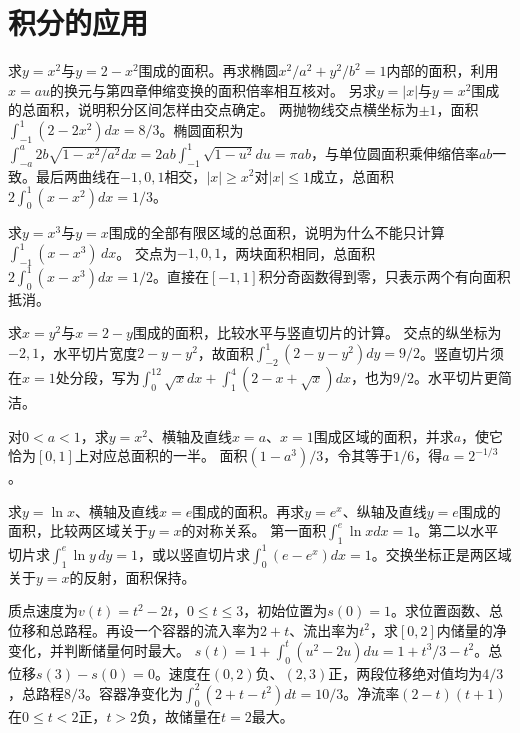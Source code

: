\par\addvspace{12pt}

\section{积分的应用}

求\(y=x^2\)与\(y=2-x^2\)围成的面积。再求椭圆\(x^2/a^2+y^2/b^2=1\)内部的面积，利用\(x=au\)的换元与第四章伸缩变换的面积倍率相互核对。
另求\(y=|x|\)与\(y=x^2\)围成的总面积，说明积分区间怎样由交点确定。
\solutionanswer
两抛物线交点横坐标为\(\pm1\)，面积\(\int_{-1}^1(2-2x^2)dx=8/3\)。椭圆面积为\(\int_{-a}^a2b\sqrt{1-x^2/a^2}dx=2ab\int_{-1}^1\sqrt{1-u^2}du=\pi ab\)，与单位圆面积乘伸缩倍率\(ab\)一致。最后两曲线在\(-1,0,1\)相交，\(|x|\ge x^2\)对\(|x|\le1\)成立，总面积\(2\int_0^1(x-x^2)dx=1/3\)。


求\(y=x^3\)与\(y=x\)围成的全部有限区域的总面积，说明为什么不能只计算\(\int_{-1}^1(x-x^3)\,dx\)。
\solutionanswer
交点为\(-1,0,1\)，两块面积相同，总面积\(2\int_0^1(x-x^3)dx=1/2\)。直接在\([-1,1]\)积分奇函数得到零，只表示两个有向面积抵消。


求\(x=y^2\)与\(x=2-y\)围成的面积，比较水平与竖直切片的计算。
\solutionanswer
交点的纵坐标为\(-2,1\)，水平切片宽度\(2-y-y^2\)，故面积\(\int_{-2}^1(2-y-y^2)dy=9/2\)。竖直切片须在\(x=1\)处分段，写为\(\int_0^12\sqrt xdx+\int_1^4(2-x+\sqrt x)dx\)，也为\(9/2\)。水平切片更简洁。


对\(0<a<1\)，求\(y=x^2\)、横轴及直线\(x=a\)、\(x=1\)围成区域的面积，并求\(a\)，使它恰为\([0,1]\)上对应总面积的一半。
\solutionanswer
面积\((1-a^3)/3\)，令其等于\(1/6\)，得\(a=2^{-1/3}\)。


求\(y=\ln x\)、横轴及直线\(x=e\)围成的面积。再求\(y=e^x\)、纵轴及直线\(y=e\)围成的面积，比较两区域关于\(y=x\)的对称关系。
\solutionanswer
第一面积\(\int_1^e\ln xdx=1\)。第二以水平切片求\(\int_1^e\ln y\,dy=1\)，或以竖直切片求\(\int_0^1(e-e^x)dx=1\)。交换坐标正是两区域关于\(y=x\)的反射，面积保持。


质点速度为\(v(t)=t^2-2t\)，\(0\le t\le3\)，初始位置为\(s(0)=1\)。求位置函数、总位移和总路程。再设一个容器的流入率为\(2+t\)、流出率为\(t^2\)，求\([0,2]\)内储量的净变化，并判断储量何时最大。
\solutionanswer
\(s(t)=1+\int_0^t(u^2-2u)du=1+t^3/3-t^2\)。总位移\(s(3)-s(0)=0\)。速度在\((0,2)\)负、\((2,3)\)正，两段位移绝对值均为\(4/3\)，总路程\(8/3\)。容器净变化为\(\int_0^2(2+t-t^2)dt=10/3\)。净流率\((2-t)(t+1)\)在\(0\le t<2\)正，\(t>2\)负，故储量在\(t=2\)最大。



